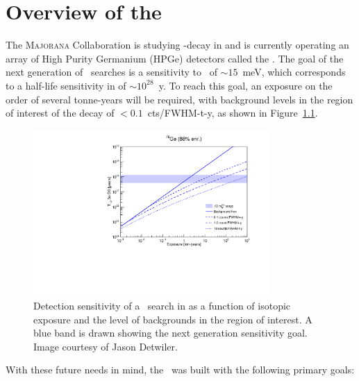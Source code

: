 \documentclass[/main.tex]{subfiles}
\begin{document}
\graphicspath{{./pics/}{ch2/pics/}}

\onlyinsubfile{\textpages}
\chapter{Overview of the \MJD}

The \textsc{Majorana} Collaboration is studying \bb -decay in  and is currently operating an array of High Purity Germanium (HPGe) detectors called the \MJD\cite{mjd2014}.
The goal of the next generation of \znbb\ searches is a sensitivity to \mbb\ of ${\sim}15$~meV, which corresponds to a half-life sensitivity in  of ${\sim}10^{28}$~y.
To reach this goal, an exposure on the order of several tonne-years will be required, with background levels in the region of interest of the decay of $<0.1$~cts/FWHM-t-y, as shown in Figure~\ref{fig:sensitivity}.
\begin{figure}[h]
  \centering
  \includegraphics[width=0.8\textwidth]{sensitivityplot}
  \caption[Detection sensitivity to \znbb\ in ]{\label{fig:sensitivity}
    Detection sensitivity of a \znbb\ search in  as a function of isotopic exposure and the level of backgrounds in the region of interest. A blue band is drawn showing the next generation sensitivity goal. Image courtesy of Jason Detwiler.
  }
\end{figure}
With these future needs in mind, the \MJD\ was built with the following primary goals:
\end{document}
